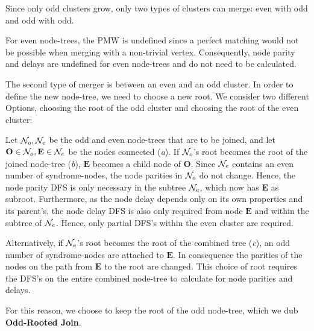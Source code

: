 
Since only odd clusters grow, only two types of clusters can merge: even with odd and odd with odd. 

For even node-trees, the PMW is undefined since a perfect matching would not be possible when merging with a non-trivial vertex. Consequently, node parity and delays are undefined for even node-trees and do not need to be calculated. 

The second type of merger is between an even and an odd cluster. %
In order to define the new node-tree, we need to choose a new root. We consider two different Options, choosing the root of the odd cluster and choosing the root of the even cluster:

Let $\mathcal{N}_o,\mathcal{N}_e$ be the odd and even node-trees that are to be joined, and let $\mathbf{O}\in \mathcal{N}_o,\mathbf{E} \in \mathcal{N}_e$ be the nodes connected (\emph{a}).
If $\mathcal{N}_o$'s root becomes the root of the joined node-tree (\emph{b}), $\mathbf{E}$ becomes a child node of $\mathbf{O}$. 
Since $\mathcal{N}_e$ contains an even number of syndrome-nodes, the node parities in $\mathcal{N}_o$ do not change. 
Hence, the node parity DFS is only necessary in the subtree $\mathcal{N}_e$, which now has $\mathbf{E}$ as subroot. 
Furthermore, as the node delay depends only on its own properties and its parent's, the node delay DFS is also only required from node $\mathbf{E}$ and within the subtree of $\mathcal{N}_e$. 
Hence, only partial DFS's within the even cluster are required. %

Alternatively, if $\mathcal{N}_e$'s root becomes the root of the combined tree (\emph{c}), an odd number of syndrome-nodes are attached to $\mathbf{E}$. In consequence the parities of the nodes on the path from $\mathbf{E}$ to the root are changed. This choice of root requires the DFS's on the entire combined node-tree to calculate for node parities and delays. 

For this reason, we choose to keep the root of the odd node-tree, which we dub \textbf{Odd-Rooted Join}. 

